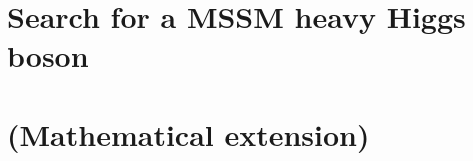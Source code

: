 \documentclass[12pt,twoside]{report}
\begin{document}
    \chapter{Search for a MSSM heavy Higgs boson}
    \label{sec:Analysis}
    
    
%     
    
    
    

    \appendix
    \chapter{(Mathematical extension)}
    
    
    
\end{document}
